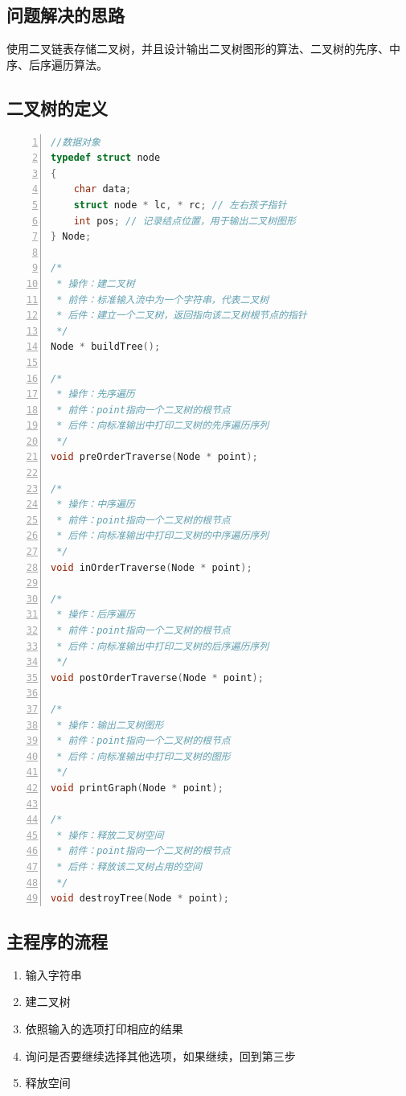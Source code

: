 \documentclass{article}
\begin{document}
\subsection{问题解决的思路}

使用二叉链表存储二叉树，并且设计输出二叉树图形的算法、二叉树的先序、中序、后序遍历算法。

\subsection{二叉树的定义}

\begin{lstlisting}[language={C},
    numbers=left,
    numberstyle=\tiny\consolas,
    basicstyle=\small\consolas]
//数据对象
typedef struct node
{
    char data;
    struct node * lc, * rc; // 左右孩子指针
    int pos; // 记录结点位置，用于输出二叉树图形
} Node;

/*
 * 操作：建二叉树
 * 前件：标准输入流中为一个字符串，代表二叉树
 * 后件：建立一个二叉树，返回指向该二叉树根节点的指针
 */
Node * buildTree();

/*
 * 操作：先序遍历
 * 前件：point指向一个二叉树的根节点
 * 后件：向标准输出中打印二叉树的先序遍历序列
 */
void preOrderTraverse(Node * point);

/*
 * 操作：中序遍历
 * 前件：point指向一个二叉树的根节点
 * 后件：向标准输出中打印二叉树的中序遍历序列
 */
void inOrderTraverse(Node * point);

/*
 * 操作：后序遍历
 * 前件：point指向一个二叉树的根节点
 * 后件：向标准输出中打印二叉树的后序遍历序列
 */
void postOrderTraverse(Node * point);

/*
 * 操作：输出二叉树图形
 * 前件：point指向一个二叉树的根节点
 * 后件：向标准输出中打印二叉树的图形
 */
void printGraph(Node * point);

/*
 * 操作：释放二叉树空间
 * 前件：point指向一个二叉树的根节点
 * 后件：释放该二叉树占用的空间
 */
void destroyTree(Node * point);
\end{lstlisting}

\subsection{主程序的流程}

\begin{enumerate}
    \item 输入字符串
    \item 建二叉树
    \item 依照输入的选项打印相应的结果
    \item 询问是否要继续选择其他选项，如果继续，回到第三步
    \item 释放空间
\end{enumerate}
\end{document}
